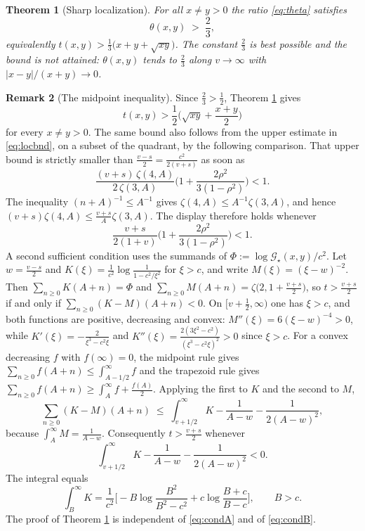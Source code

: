 \documentclass[11pt,a4paper]{amsart}
\newtheorem{theorem}{Theorem}[section]
\theoremstyle{definition}
\newtheorem{remark}[theorem]{Remark}
\newcommand{\Gs}{\mathcal{G}_{\star}}
\begin{document}
\begin{theorem}[Sharp localization]\label{thm:sharp}
For all $x\ne y>0$ the ratio \eqref{eq:theta} satisfies
\begin{equation}\label{eq:conj}
  \theta(x,y)\;>\;\frac{2}{3},
\end{equation}
equivalently $t(x,y)>\frac13\big(x+y+\sqrt{xy}\big)$. The constant $\frac23$ is best
possible and the bound is not attained: $\theta(x,y)$ tends to $\frac23$
along $v\to\infty$ with $|x-y|/(x+y)\to0$.
\end{theorem}

\begin{remark}[The midpoint inequality]\label{rem:mid}
Since $\frac23>\frac12$, Theorem \ref{thm:sharp} gives
\begin{equation}\label{eq:midpoint}
  t(x,y)>\frac12\Big(\sqrt{xy}+\frac{x+y}{2}\Big)
\end{equation}
for every $x\ne y>0$. The same bound also follows from the upper estimate in
\eqref{eq:locbnd}, on a subset of the quadrant, by the following comparison. That upper
bound is strictly smaller than $\frac{v-s}{2}=\frac{c^{2}}{2(v+s)}$ as soon as
\[
  \frac{(v+s)\,\zeta(4,A)}{2\,\zeta(3,A)}
  \Big(1+\frac{2\rho^{2}}{3(1-\rho^{2})}\Big)<1 .
\]
The inequality $(n+A)^{-1}\le A^{-1}$ gives $\zeta(4,A)\le A^{-1}\zeta(3,A)$, and hence
$(v+s)\zeta(4,A)\le\frac{v+s}{A}\zeta(3,A)$. The display therefore holds whenever
\begin{equation}\label{eq:condA}
  \frac{v+s}{2(1+v)}\Big(1+\frac{2\rho^{2}}{3(1-\rho^{2})}\Big)<1 .
\end{equation}
A second sufficient condition uses the summands of $\Phi:=\log\Gs(x,y)/c^{2}$. Let
$w=\frac{v-s}{2}$ and
$K(\xi)=\frac{1}{c^{2}}\log\frac{1}{1-c^{2}/\xi^{2}}$ for $\xi>c$, and write
$M(\xi)=(\xi-w)^{-2}$. Then $\sum_{n\ge0}K(A+n)=\Phi$ and
$\sum_{n\ge0}M(A+n)=\zeta\big(2,1+\frac{v+s}{2}\big)$, so
$t>\frac{v+s}{2}$ if and only if $\sum_{n\ge0}(K-M)(A+n)<0$. On
$\big[v+\frac12,\infty\big)$ one has $\xi>c$, and both functions are positive, decreasing
and convex: $M''(\xi)=6(\xi-w)^{-4}>0$, while
$K'(\xi)=-\frac{2}{\xi^{3}-c^{2}\xi}$ and
$K''(\xi)=\frac{2(3\xi^{2}-c^{2})}{(\xi^{3}-c^{2}\xi)^{2}}>0$ since $\xi>c$. For a convex decreasing $f$
with $f(\infty)=0$, the midpoint rule gives
$\sum_{n\ge0}f(A+n)\le\int_{A-1/2}^{\infty}f$ and the trapezoid rule gives
$\sum_{n\ge0}f(A+n)\ge\int_{A}^{\infty}f+\frac{f(A)}{2}$. Applying the first to $K$ and
the second to $M$,
\[
  \sum_{n\ge0}(K-M)(A+n)
  \;\le\;\int_{v+1/2}^{\infty}K-\frac{1}{A-w}-\frac{1}{2(A-w)^{2}},
\]
because $\int_{A}^{\infty}M=\frac{1}{A-w}$. Consequently $t>\frac{v+s}{2}$ whenever
\begin{equation}\label{eq:condB}
  \int_{v+1/2}^{\infty}K-\frac{1}{A-w}-\frac{1}{2(A-w)^{2}}<0 .
\end{equation}
The integral equals
\begin{equation}\label{eq:intK}
  \int_{B}^{\infty}K
  =\frac{1}{c^{2}}\Big[-B\log\frac{B^{2}}{B^{2}-c^{2}}
     +c\log\frac{B+c}{B-c}\Big],\qquad B>c .
\end{equation}
The proof of Theorem \ref{thm:sharp} is independent of \eqref{eq:condA} and of
\eqref{eq:condB}.
\end{remark}
\end{document}
